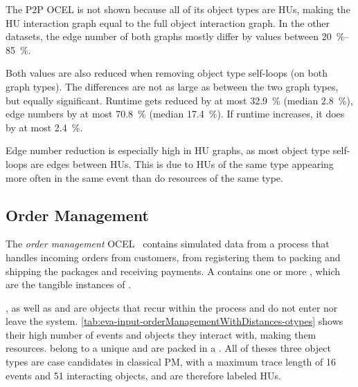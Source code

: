 The P2P OCEL is not shown because all of its object types are HUs, making the HU interaction graph equal to the full object interaction graph. In the other datasets, the edge number of both graphs mostly differ by values between \qtyrange{20}{85}{\percent}.

Both values are also reduced when removing object type self-loops (on both graph types).
The differences are not as large as between the two graph types, but equally significant.
Runtime gets reduced by at most \qty{32.9}{\percent} (median \qty{2.8}{\percent}), edge numbers by at most \qty{70.8}{\percent} (median \qty{17.4}{\percent}).
If runtime increases, it does by at most \qty{2.4}{\percent}.

Edge number reduction is especially high in HU graphs,
as most object type self-loops are edges between HUs.
This is due to HUs of the same type appearing more often in the same event than do resources of the same type.

\subsection{Order Management}
\label{ssec:eva-results-orderManagement}

The \textit{order management} OCEL~\cite{orderManagement}
contains simulated data from a process that handles incoming orders from customers, from registering them to packing and shipping the packages and receiving payments.
A  contains one or more , which are the tangible instances of .

, as well as  and  are objects that recur within the process and do not enter nor leave the system. \autoref{tab:eva-input-orderManagementWithDistances-otypes} shows their high number of events and objects they interact with, making them resources.
 belong to a unique  and are packed in a . All of theses three object types are case candidates in classical PM, with a maximum trace length of 16 events and 51 interacting objects, and are therefore labeled HUs.

